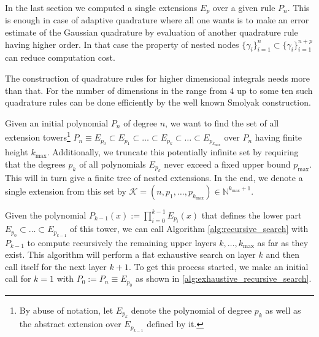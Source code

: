 \documentclass[a4paper,10pt]{article}
\begin{document}
In the last section we computed a single extensions $E_p$ over a
given rule $P_n$. This is enough in case of adaptive quadrature where all one
wants is to make an error estimate of the Gaussian quadrature by evaluation
of another quadrature rule having higher order. In that case the property of
nested nodes $\{\gamma_i\}_{i=1}^n \subset \{\gamma_i\}_{i=1}^{n+p}$ can reduce
computation cost.

The construction of quadrature rules for higher dimensional integrals
needs more than that. For the number of dimensions in the range from $4$ up
to some ten such quadrature rules can be done efficiently by the well known
Smolyak construction.

Given an initial polynomial $P_n$ of degree $n$, we want to find the set of all
extension towers\footnote{By abuse of notation, let $E_{p_k}$ denote the polynomial
of degree $p_k$ as well as the abstract extension over $E_{p_{k-1}}$ defined by it.}
$P_n \equiv E_{p_0} \subset E_{p_1} \subset \ldots \subset E_{p_k} \subset \ldots \subset E_{p_{k_{\textrm{max}}}}$
over $P_n$ having finite height $k_{\textrm{max}}$. Additionally, we truncate this
potentially infinite set by requiring that the degrees $p_k$ of all polynomials $E_{p_k}$
never exceed a fixed upper bound $p_{\textrm{max}}$. This will in turn give a finite tree
of nested extensions. In the end, we denote a single extension from this set
by $\mathcal{K} = (n, p_1, \ldots, p_{k_{\textrm{max}}}) \in \mathbb{N}^{{k_{\textrm{max}}}+1}$.

Given the polynomial $P_{k-1}(x) := \prod_{i=0}^{k-1} E_{p_i}(x)$ that defines the
lower part $E_{p_0} \subset \ldots \subset E_{p_{k-1}}$ of this tower,
we can call Algorithm \ref{alg:recursive_search} with $P_{k-1}$ to compute recursively the remaining
upper layers $k, \ldots, k_{\textrm{max}}$ as far as they exist. This algorithm will perform a
flat exhaustive search on layer $k$ and then call itself for the next layer $k+1$. To get this
process started, we make an initial call for $k=1$ with $P_{0} := P_n \equiv E_{p_0}$ as shown
in \ref{alg:exhaustive_recursive_search}.
\end{document}
